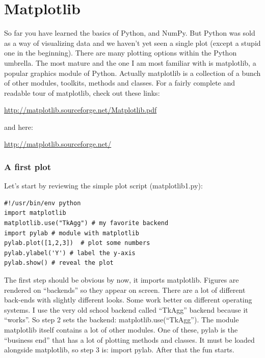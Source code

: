 \documentclass[11pt]{book}
\begin{document}
{{{
\section{Matplotlib}

So far you have learned the basics of Python, and NumPy.  But Python was sold as a way of visualizing data and we haven't yet seen a single plot (except a stupid one in the beginning). There are many plotting options within the Python umbrella. The most mature and the one I am most familiar with is {\color{blue}matplotlib}, a popular  graphics module of Python.  
Actually  {\color{blue}matplotlib} is a collection of a bunch of other modules, toolkits, methods and  classes.   For a fairly complete and readable tour of matplotlib, check out these links:  
 
\url{http://matplotlib.sourceforge.net/Matplotlib.pdf}

\noindent
and here:

\url{http://matplotlib.sourceforge.net/}




\subsubsection{A first plot}

Let's start by reviewing the   simple plot script ({\color{blue}matplotlib1.py}):


{ \color{blue} \begin{verbatim}
#!/usr/bin/env python
import matplotlib
matplotlib.use("TkAgg") # my favorite backend
import pylab # module with matplotlib
pylab.plot([1,2,3])  # plot some numbers
pylab.ylabel('Y') # label the y-axis
pylab.show() # reveal the plot
\end{verbatim}}



The first step should be obvious by now, it imports {\color{blue}matplotlib}.
Figures are rendered on ``backends'' so they appear on screen.  There are a lot of different back-ends with slightly different looks.  Some work better on different operating systems.  I use the very old school backend called  ``TkAgg'' backend because it ``works''.  So step 2  sets the backend: {\color{blue}matplotlib.use(``TkAgg'')}.  The module {\color{blue}matplotlib} itself contains a lot of other modules.  One of these, 
{\color{blue}pylab} is the ``business end'' that has a lot of plotting methods and classes.  It must be  loaded alongside {\color{blue}matplotlib},   so step 3 is:  {\color{blue}import pylab}. After that the fun starts.  

}}}
\end{document}
